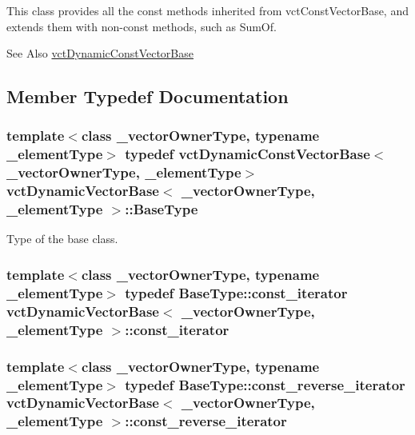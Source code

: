 This class provides all the const methods inherited from vct\-Const\-Vector\-Base, and extends them with non-\/const methods, such as Sum\-Of.

\begin{DoxySeeAlso}{See Also}
\hyperlink{classvct_dynamic_const_vector_base}{vct\-Dynamic\-Const\-Vector\-Base} 
\end{DoxySeeAlso}


\subsection{Member Typedef Documentation}
\hypertarget{classvct_dynamic_vector_base_a773a8005371ea8d078a842eff2cb719f}{
\subsubsection[{Base\-Type}]{\setlength{\rightskip}{0pt plus 5cm}template$<$class \-\_\-vector\-Owner\-Type, typename \-\_\-element\-Type$>$ typedef {\bf vct\-Dynamic\-Const\-Vector\-Base}$<$\-\_\-vector\-Owner\-Type, \-\_\-element\-Type$>$ {\bf vct\-Dynamic\-Vector\-Base}$<$ \-\_\-vector\-Owner\-Type, \-\_\-element\-Type $>$\-::{\bf Base\-Type}}}\label{classvct_dynamic_vector_base_a773a8005371ea8d078a842eff2cb719f}
Type of the base class. \hypertarget{classvct_dynamic_vector_base_adf3a8f5fcdecc355b9930fa2166e3fb6}{
\subsubsection[{const\-\_\-iterator}]{\setlength{\rightskip}{0pt plus 5cm}template$<$class \-\_\-vector\-Owner\-Type, typename \-\_\-element\-Type$>$ typedef {\bf Base\-Type\-::const\-\_\-iterator} {\bf vct\-Dynamic\-Vector\-Base}$<$ \-\_\-vector\-Owner\-Type, \-\_\-element\-Type $>$\-::{\bf const\-\_\-iterator}}}\label{classvct_dynamic_vector_base_adf3a8f5fcdecc355b9930fa2166e3fb6}
\hypertarget{classvct_dynamic_vector_base_a19db937e3f8b2fdc7c7d6e720c2bc9b3}{
\subsubsection[{const\-\_\-reverse\-\_\-iterator}]{\setlength{\rightskip}{0pt plus 5cm}template$<$class \-\_\-vector\-Owner\-Type, typename \-\_\-element\-Type$>$ typedef {\bf Base\-Type\-::const\-\_\-reverse\-\_\-iterator} {\bf vct\-Dynamic\-Vector\-Base}$<$ \-\_\-vector\-Owner\-Type, \-\_\-element\-Type $>$\-::{\bf const\-\_\-reverse\-\_\-iterator}}}\label{classvct_dynamic_vector_base_a19db937e3f8b2fdc7c7d6e720c2bc9b3}
